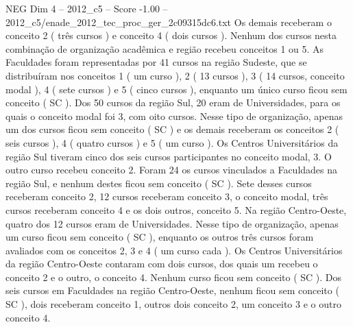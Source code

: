 \begin{textsample}{NEG Dim 4 – 2012\_c5 – Score -1.00 – 2012\_c5/enade\_2012\_tec\_proc\_ger\_2c09315dc6.txt}
Os demais receberam o conceito 2 ( três cursos ) e conceito 4 ( dois cursos ).
Nenhum dos cursos nesta combinação de organização acadêmica e região recebeu conceitos 1 ou 5.
As Faculdades foram representadas por 41 cursos na região Sudeste, que se distribuíram nos conceitos 1 ( um curso ), 2 ( 13 cursos ), 3 ( 14 cursos, conceito modal ), 4 ( sete cursos ) e 5 ( cinco cursos ), enquanto um único curso ficou sem conceito ( SC ).
Dos 50 cursos da região Sul, 20 eram de Universidades, para os quais o conceito modal foi 3, com oito cursos.
Nesse tipo de organização, apenas um dos cursos ficou sem conceito ( SC ) e os demais receberam os conceitos 2 ( seis cursos ), 4 ( quatro cursos ) e 5 ( um curso ).
Os Centros Universitários da região Sul tiveram cinco dos seis cursos participantes no conceito modal, 3.
O outro curso recebeu conceito 2.
Foram 24 os cursos vinculados a Faculdades na região Sul, e nenhum destes ficou sem conceito ( SC ).
Sete desses cursos receberam conceito 2, 12 cursos receberam conceito 3, o conceito modal, três cursos receberam conceito 4 e os dois outros, conceito 5.
Na região Centro-Oeste, quatro dos 12 cursos eram de Universidades.
Nesse tipo de organização, apenas um curso ficou sem conceito ( SC ), enquanto os outros três cursos foram avaliados com os conceitos 2, 3 e 4 ( um curso cada ).
Os Centros Universitários da região Centro-Oeste contaram com dois cursos, dos quais um recebeu o conceito 2 e o outro, o conceito 4.
Nenhum curso ficou sem conceito ( SC ).
Dos seis cursos em Faculdades na região Centro-Oeste, nenhum ficou sem conceito ( SC ), dois receberam conceito 1, outros dois conceito 2, um conceito 3 e o outro conceito 4.

\end{textsample}
